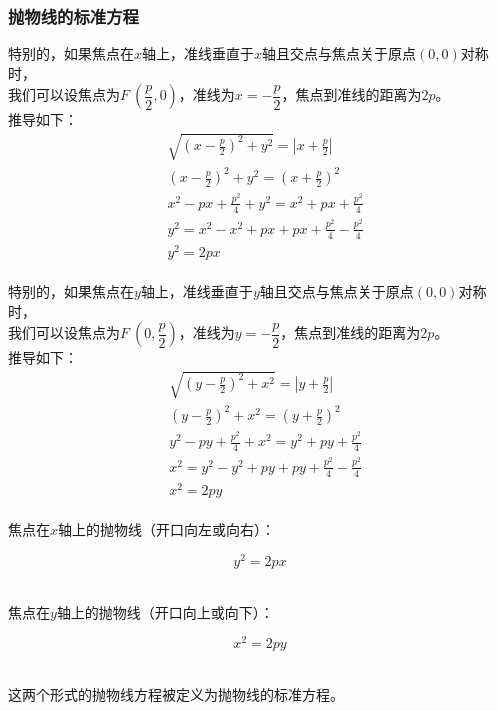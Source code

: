 \documentclass[UTF8]{ctexart}
\begin{document}
\subsubsection{抛物线的标准方程}
    特别的，如果焦点在$x$轴上，准线垂直于$x$轴且交点与焦点关于原点$(0,0)$对称时，\\[2mm]
    我们可以设焦点为$F~(\dfrac{p}{2},0)$，准线为$x=-\dfrac{p}{2}$，焦点到准线的距离为$2p$。\\[4mm]
    推导如下：
    \setcounter{equation}{0}
    \begin{align}
        &\sqrt{\left(x-\frac{p}{2}\right)^2+y^2}=\left|x+\frac{p}{2}\right|\\[3mm]
        &\left(x-\frac{p}{2}\right)^2+y^2=\left(x+\frac{p}{2}\right)^2\\[3mm]
        &x^2-px+\frac{p^2}{4}+y^2=x^2+px+\frac{p^2}{4}\\[1mm]
        &y^2=x^2-x^2+px+px+\frac{p^2}{4}-\frac{p^2}{4}\\[1mm]
        &y^2=2px
    \end{align}\\
    特别的，如果焦点在$y$轴上，准线垂直于$y$轴且交点与焦点关于原点$(0,0)$对称时，\\[2mm]
    我们可以设焦点为$F~(0,\dfrac{p}{2})$，准线为$y=-\dfrac{p}{2}$，焦点到准线的距离为$2p$。\\[4mm]
    推导如下：
    \setcounter{equation}{0}
    \begin{align}
        &\sqrt{\left(y-\frac{p}{2}\right)^2+x^2}=\left|y+\frac{p}{2}\right|\\[3mm]
        &\left(y-\frac{p}{2}\right)^2+x^2=\left(y+\frac{p}{2}\right)^2\\[3mm]
        &y^2-py+\frac{p^2}{4}+x^2=y^2+py+\frac{p^2}{4}\\[1mm]
        &x^2=y^2-y^2+py+py+\frac{p^2}{4}-\frac{p^2}{4}\\[1mm]
        &x^2=2py
    \end{align}\\
    焦点在$x$轴上的抛物线（开口向左或向右）：
    \begin{large}
        \begin{equation*}
            y^2=2px
        \end{equation*}
    \end{large}\\
    焦点在$y$轴上的抛物线（开口向上或向下）：
    \begin{large}
        \begin{equation*}
            x^2=2py
        \end{equation*}
    \end{large}\\
    这两个形式的抛物线方程被定义为抛物线的标准方程。
\end{document}
